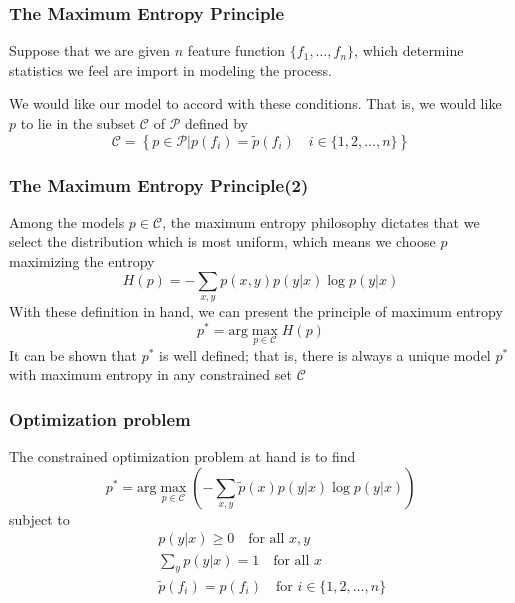\documentclass[slidestop,compress,mathserif]{beamer}
\begin{document}
	\begin{frame}
		\frametitle{The Maximum Entropy Principle}
		Suppose that we are given $n$ feature function $\{f_1,\ldots,f_n\}$, which determine statistics we feel are import in modeling the process.
		
		We would like our model to accord with these conditions. That is, we would like $p$ to lie in the subset $\mathcal{C}$ of $\mathcal{P}$ defined by
		\begin{equation}
			\mathcal{C} = \left\{ p\in\mathcal{P} | p(f_i) = \widetilde{p}(f_i) \quad i\in \{1,2,\ldots,n\} \right\}
		\end{equation}
		\begin{figure}
		\end{figure}
	\end{frame}
	
	\begin{frame}
		\frametitle{The Maximum Entropy Principle(2)}
		Among the models $p\in \mathcal{C}$, the maximum entropy philosophy dictates that we select the distribution which is most uniform, which means we choose $p$ maximizing the entropy
		\begin{equation}
			H(p) = -\sum_{x,y}p(x,y)p(y|x)\log p(y|x)
		\end{equation}
		With these definition in hand, we can present the principle of maximum entropy
		\begin{equation}
			p^* = \mathrm{arg}\max_{p\in \mathcal{C}} H(p)
		\end{equation} 
		It can be shown that $p^*$ is well defined; that is, there is always a unique model $p^*$ with maximum entropy in any constrained set $\mathcal{C}$ 
	\end{frame}

	\begin{frame}
		\frametitle{Optimization problem}
		The constrained optimization problem at hand is to find
		\begin{equation}
			p^* = \mathrm{arg}\max_{p\in\mathcal{C}}\left(-\sum_{x,y}\widetilde{p}(x)p(y|x)\log p(y|x) \right)
		\end{equation}
		subject to
		\begin{eqnarray}
			&& p(y|x) \geq 0 \quad \mbox{for all $x,y$}\\
			&& \sum_y p(y|x) = 1 \quad \mbox{for all $x$}\\
			&& \widetilde{p}(f_i) = p(f_i) \quad \mbox{for $i\in \{1,2,\ldots,n\}$}
		\end{eqnarray}
	\end{frame}
	
\end{document}
